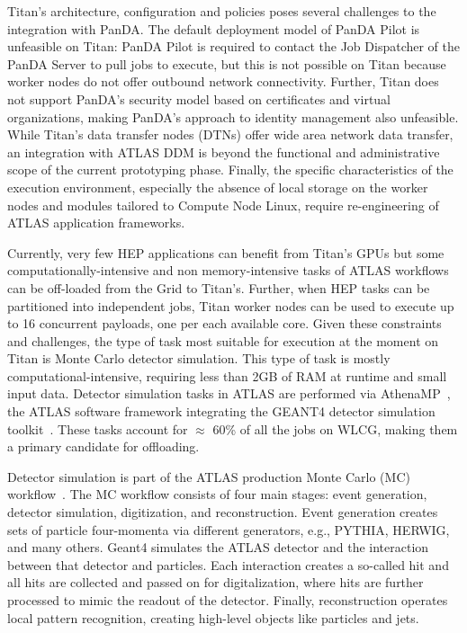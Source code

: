 Titan's architecture, configuration and policies poses several challenges to
the integration with PanDA\@. The default deployment model of PanDA Pilot is
unfeasible on Titan: PanDA Pilot is required to contact the Job Dispatcher of
the PanDA Server to pull jobs to execute, but this is not possible on Titan
because worker nodes do not offer outbound network connectivity. Further,
Titan does not support PanDA's security model based on certificates and
virtual organizations, making PanDA's approach to identity management also
unfeasible. While Titan's data transfer nodes (DTNs) offer wide area network
data transfer, an integration with ATLAS DDM is beyond the functional and
administrative scope of the current prototyping phase. Finally, the specific
characteristics of the execution environment, especially the absence of local
storage on the worker nodes and modules tailored to Compute Node Linux,
require re-engineering of ATLAS application frameworks.

Currently, very few HEP applications can benefit from Titan's GPUs but some
computationally-intensive and non memory-intensive tasks of ATLAS workflows
can be off-loaded from the Grid to Titan's. Further, when HEP tasks can be
partitioned into independent jobs, Titan worker nodes can be used to execute
up to 16 concurrent payloads, one per each available core. Given these
constraints and challenges, the type of task most suitable for execution at
the moment on Titan is Monte Carlo detector simulation. This type of task is
mostly computational-intensive, requiring less than 2GB of RAM at runtime and
small input data. Detector simulation tasks in ATLAS are performed via
AthenaMP~\cite{aad2010atlas}, the ATLAS software framework integrating the
GEANT4 detector simulation toolkit~\cite{agostinelli2003geant4}. These tasks
account for $\approx$ 60\% of all the jobs on WLCG, making them a primary
candidate for offloading.

Detector simulation is part of the ATLAS production Monte Carlo (MC)
workflow~\cite{rimoldi2006atlas}.%
The MC workflow consists of four main stages: event generation, detector
simulation, digitization, and reconstruction. Event generation creates sets
of particle four-momenta via different generators, e.g.,
PYTHIA,%
HERWIG,%
and many others. Geant4 simulates the ATLAS detector and the interaction
between that detector and particles. Each interaction creates a so-called hit
and all hits are collected and passed on for digitalization, where hits are
further processed to mimic the readout of the detector. Finally,
reconstruction operates local pattern recognition, creating high-level
objects like particles and jets.

